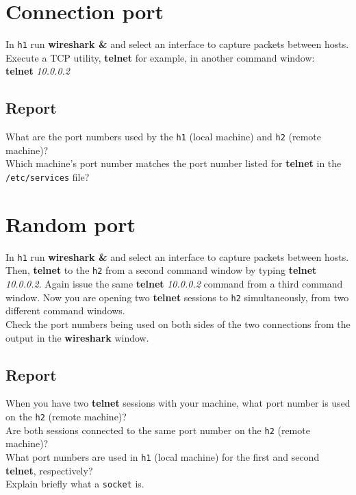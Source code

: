 \documentclass{../UTNetLab}
\begin{document}
\section{Connection port}
    In \texttt{h1} run \textbf{wireshark \&} and select an interface to capture packets between hosts. \\
    Execute a TCP utility, \textbf{telnet} for example, in another command window: \\
    \textbf{telnet} \textit{10.0.0.2}
    \subsection*{Report}
    What are the port numbers used by the \texttt{h1} (local machine) and \texttt{h2} (remote machine)? \\
    Which machine’s port number matches the port number listed for \textbf{telnet} in the \texttt{/etc/services} file? \\

\section{Random port}
    In \texttt{h1} run \textbf{wireshark \&} and select an interface to capture packets between hosts. \\
    Then, \textbf{telnet} to the \texttt{h2} from a second command window by typing \textbf{telnet} \textit{10.0.0.2}.
    Again issue the same \textbf{telnet} \textit{10.0.0.2} command from a third command window.
    Now you are opening two \textbf{telnet} sessions to \texttt{h2} simultaneously, from two different command windows. \\
    Check the port numbers being used on both sides of the two connections from the output in the \textbf{wireshark} window. \\
    \subsection*{Report}
    When you have two \textbf{telnet} sessions with your machine, what port number is used on the \texttt{h2} (remote machine)? \\
    Are both sessions connected to the same port number on the \texttt{h2} (remote machine)? \\
    What port numbers are used in \texttt{h1} (local machine) for the first and second \textbf{telnet}, respectively? \\
    Explain briefly what a \texttt{socket} is. \\
\end{document}
